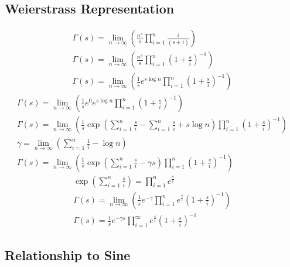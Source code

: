 	\subsection{Weierstrass Representation}
	$$
	\begin{gathered}
		\Gamma(s)=\lim _{n \rightarrow \infty}\left(\frac{n^s}{s} \prod_{i=1}^n \frac{i}{(s+i)}\right) \\
		\Gamma(s)=\lim _{n \rightarrow \infty}\left(\frac{n^s}{s} \prod_{i=1}^n\left(1+\frac{s}{i}\right)^{-1}\right) \\
		\Gamma(s)=\lim _{n \rightarrow \infty}\left(\frac{1}{s} e^{s \log n} \prod_{i=1}^n\left(1+\frac{s}{i}\right)^{-1}\right)
	\end{gathered}
	$$
	$$
	\begin{gathered}
		\Gamma(s)=\lim _{n \rightarrow \infty}\left(\frac{1}{s} e^0 e^{s \log n} \prod_{i=1}^n\left(1+\frac{s}{i}\right)^{-1}\right) \\
		\Gamma(s)=\lim _{n \rightarrow \infty}\left(\frac{1}{s} \exp{\left(\sum_{i=1}^n \frac{s}{i} - \sum_{i=1}^n \frac{s}{i} + s \operatorname{log} n\right) }  \prod_{i=1}^n\left(1+\frac{s}{i}\right)^{-1}\right) \\
		\gamma=\lim _{n \rightarrow \infty}\left(\sum_{i=1}^n \frac{1}{i}-\log n\right) \\
		\Gamma(s)=\lim _{n \rightarrow \infty}\left(\frac{1}{s} \exp{\left(\sum_{i=1}^n \frac{s}{i}-\gamma s\right)} \prod_{i=1}^n\left(1+\frac{s}{i}\right)^{-1}\right)
	\end{gathered}
	$$
	$$
	\begin{gathered}
		\exp{\left(\sum_{i=1}^n \frac{s}{i}\right)}=\prod_{i=1}^n e^{\frac{s}{i}} \\
		\Gamma(s)=\lim _{n \rightarrow \infty}\left(\frac{1}{s} e^{-\gamma} \prod_{i=1}^n e^{\frac{s}{i}}\left(1+\frac{s}{i}\right)^{-1}\right) \\
		\Gamma(s)=\frac{1}{s} e^{-\gamma s} \prod_{i=1}^{\infty} e^{\frac{s}{i}}\left(1+\frac{s}{i}\right)^{-1}
	\end{gathered}
	$$
	\subsection{Relationship to Sine}
	
	

